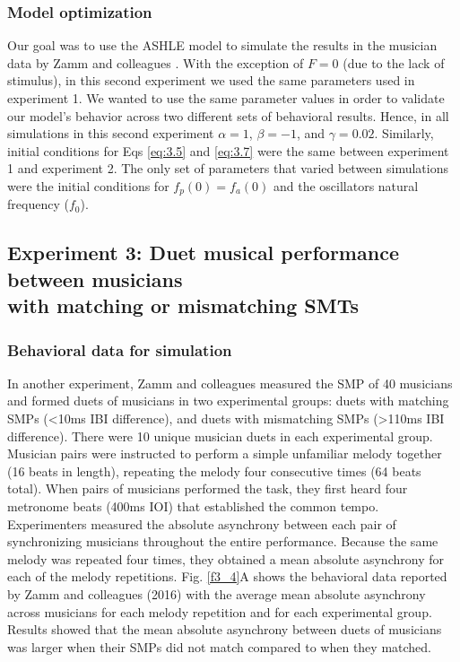\documentclass{report}
\begin{document}
\subsubsection{Model optimization}

Our goal was to use the ASHLE model to simulate the results in the musician data by Zamm and colleagues \cite{zamm2018musicians}. With the exception of $F = 0$	(due to the lack of stimulus), in this second experiment we used the same parameters used in experiment 1. We wanted to use the same parameter values in order to validate our model's behavior across two different sets of behavioral results. Hence, in all simulations in this second experiment $\alpha = 1$, $\beta = −1$, and $\gamma = 	0.02$. Similarly, initial conditions for Eqs \eqref{eq:3.5} and \eqref{eq:3.7} were the same between experiment 1 and experiment 2. The only set of parameters that varied between simulations were the initial conditions for $f_p(0)=f_a(0)$ and the oscillators natural frequency ($f_0$).

\subsection{Experiment 3: Duet musical performance between musicians \\ with matching or mismatching SMTs}

\subsubsection{Behavioral data for simulation}

In another experiment, Zamm and colleagues \cite{zamm2016endogenous} measured the SMP of 40 musicians and formed duets of musicians in two experimental groups: duets with matching SMPs (<10ms IBI difference), and duets with mismatching SMPs (>110ms IBI difference). There were 10 unique musician duets in each experimental group. Musician pairs were instructed to perform a simple unfamiliar melody together (16 beats in length), repeating the melody four consecutive times (64 beats total). When pairs of musicians performed the task, they first heard four metronome beats (400ms IOI) that established the common tempo. Experimenters measured the absolute asynchrony between each pair of synchronizing musicians throughout the entire performance. Because the same melody was repeated four times, they obtained a mean absolute asynchrony for each of the melody repetitions. Fig.{} \ref{f3_4}A shows the behavioral data reported by Zamm and colleagues (2016) with the average mean absolute asynchrony across musicians for each melody repetition and for each experimental group. Results showed that the mean absolute asynchrony between duets of musicians was larger when their SMPs did not match compared to when they matched.
\end{document}
